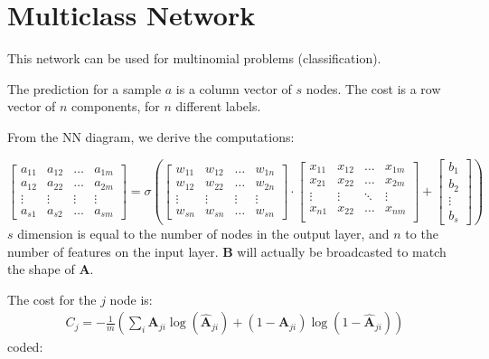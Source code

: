 \section{Multiclass Network}

This network can be used for multinomial problems (classification).

The prediction for a sample $a$ is a column vector of $s$ nodes. The cost is a row vector of $n$ components, for $n$ different labels.

From the NN diagram, we derive the computations:

\begin{equation*}
  \begin{bmatrix}
    a_{11} & a_{12}& \ldots& a_{1m}\\ 
    a_{12} & a_{22}& \ldots& a_{2m}\\ 
    \vdots & \vdots & \vdots& \vdots\\ 
    a_{s1} & a_{s2}& \ldots& a_{sm} 
  \end{bmatrix}
    =\sigma( 
  \begin{bmatrix}
    w_{11} & w_{12}& \ldots& w_{1n}\\ 
    w_{12} & w_{22}& \ldots& w_{2n}\\ 
    \vdots & \vdots & \vdots& \vdots\\ 
    w_{sn} & w_{sn}& \ldots& w_{sn} 
  \end{bmatrix}
  \cdot{}
  \begin{bmatrix}
    x_{11} & x_{12} & \ldots & x_{1m}\\
    x_{21} & x_{22} & \ldots & x_{2m}\\
    \vdots & \vdots & \ddots & \vdots\\
    x_{n1} & x_{22} & \ldots & x_{nm}\\
  \end{bmatrix}
  +
  \begin{bmatrix}
    b_1\\ b_2\\ \vdots\\ b_s
  \end{bmatrix})
\end{equation*}
$s$ dimension is equal to the number of nodes in the output layer, and $n$ to the number of features on the input layer. $\mathbf{B}$ will actually be broadcasted to match the shape of $\mathbf{A}$. 

The cost for the $j$ node is:
\begin{align}
  C_j = -\frac{1}{m}\left(\sum_i \mathbf{A}_{ji}\log(\hat{\mathbf{A}}_{ji}) + (1-\mathbf{A}_{ji})\log(1-\hat{\mathbf{A}}_{ji})\right) 
\end{align}
coded:

